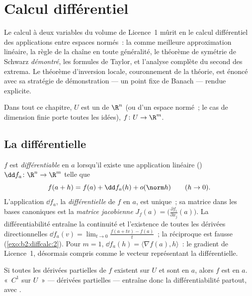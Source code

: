 \chapter{Calcul différentiel}\label{ch:b2:diffcalc}

Le calcul à deux variables du volume de Licence~1 mûrit en le calcul
différentiel des applications entre espaces normés~: la
\emph{} comme meilleure approximation linéaire, la règle
de la chaîne en toute généralité, le théorème de symétrie de Schwarz
\emph{démontré}, les formules de Taylor, et l'analyse complète du
second  des extrema. Le théorème d'inversion locale, couronnement
de la théorie, est énoncé avec sa stratégie de démonstration --- un
point fixe de Banach --- rendue explicite.

Dans tout ce chapitre, $U$ est un  de $\R^n$ (ou d'un espace
normé~; le cas de dimension finie porte toutes les idées), $f \colon U
\to \R^m$.

\section{La différentielle}

\begin{definition}\label{def:b2:diffcalc:differential}
$f$ est \emph{différentiable} en $a$ lorsqu'il
existe une application linéaire () $\dd f_a \colon \R^n \to
\R^m$ telle que
\[
f(a + h) = f(a) + \dd f_a(h) + o(\norm h)
\qquad (h \to 0).
\]
L'application $\dd f_a$, la \emph{différentielle}
de $f$ en $a$, est unique~; sa matrice dans les bases canoniques est
la \emph{matrice jacobienne} $J_f(a) =
\bigl(\frac{\partial f_i}{\partial x_j}(a)\bigr)$.
La différentiabilité entraîne la continuité et l'existence de toutes
les dérivées directionnelles $\dd f_a(v) = \lim_{t\to0}\frac{f(a + tv)
- f(a)}{t}$~; la réciproque est fausse
(\cref{exo:b2:diffcalc:2}). Pour $m = 1$, $\dd f_a(h) = \langle
\nabla f(a), h\rangle$~: le gradient de Licence~1, désormais compris
comme le vecteur représentant la différentielle.
\end{definition}

\begin{theorem}[Critère $C^1$]\label{thm:b2:diffcalc:c1}
Si toutes les dérivées partielles de $f$ existent sur $U$ et sont
 en $a$, alors $f$ est  en $a$. «~$C^1$ sur
$U$~» --- dérivées partielles  --- entraîne donc la
différentiabilité partout, avec  .
\end{theorem}


